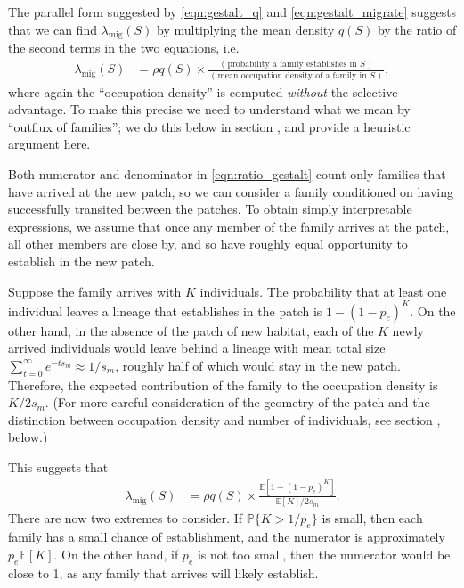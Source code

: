 \documentclass{article}
\renewcommand{\P}{\mathbb{P}}
\newcommand{\E}{\mathbb{E}}
\newcommand{\migrate}{\lambda_\text{mig}}
\newcommand{\secref}[1]{{\emph{\nameref{#1}}}}
\begin{document}
The parallel form suggested by \eqref{eqn:gestalt_q} and \eqref{eqn:gestalt_migrate}
suggests that we can find $\migrate(S)$ by multiplying the mean density $q(S)$
by the ratio of the second terms in the two equations,
i.e.
\begin{align} \label{eqn:ratio_gestalt}
  \migrate(S) 
    &= \rho q(S) \times 
    \frac{
        \text{ ( probability a family establishes in $S$ ) }
    }{
        \text{ ( mean occupation density of a family in $S$ ) }
    } ,
\end{align}
where again the ``occupation density'' is computed \emph{without} the selective advantage.
To make this precise we need to understand what we mean by ``outflux of families'';
we do this below in section \secref{ss:hitting_occupation},
and provide a heuristic argument here.

Both numerator and denominator in \eqref{eqn:ratio_gestalt} 
count only families that have arrived at the new patch,
so we can consider a family conditioned on having successfully transited between the patches.
To obtain simply interpretable expressions,
we assume that once any member of the family arrives at the patch,
all other members are close by, and so have roughly equal opportunity
to establish in the new patch.

Suppose the family arrives with $K$ individuals.
The probability that at least one individual leaves a lineage that establishes in the patch
is $1-(1-p_e)^K$.
On the other hand, in the absence of the patch of new habitat,
each of the $K$ newly arrived individuals would leave behind a lineage with 
mean total size $\sum_{t=0}^\infty e^{-t s_m} \approx 1/s_m$,
roughly half of which would stay in the new patch.
Therefore, the expected contribution of the family to the occupation density is $K/2s_m$.
(For more careful consideration of the geometry of the patch
and the distinction between occupation density and number of individuals,
see section \secref{ss:hitting_occupation}, below.)

This suggests that 
\begin{align} \label{eqn:ratio_K}
  \migrate(S) 
    &= \rho q(S) \times 
    \frac{
        \E[1-(1-p_e)^K]
    }{
        \E[K]/2s_m
    } .
\end{align}
There are now two extremes to consider.
If $\P\{K>1/p_e\}$ is small, then each family has a small chance of establishment,
and the numerator is approximately $p_e \E[K]$.
On the other hand, if $p_e$ is not too small,
then the numerator would be close to 1, as any family that arrives will likely establish.
\end{document}
